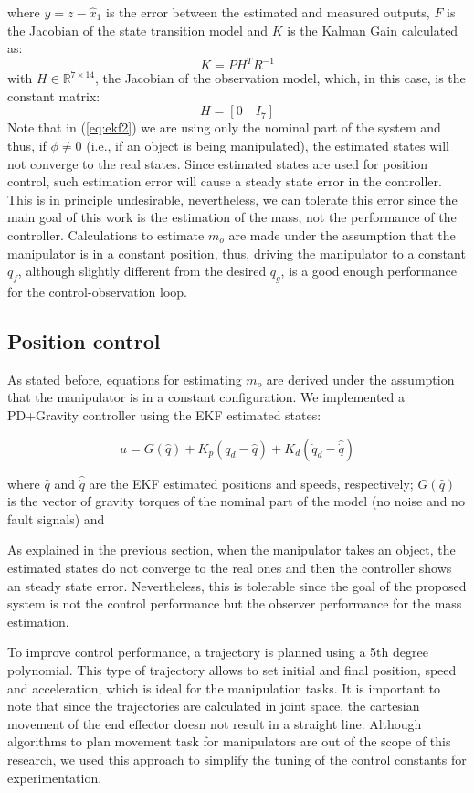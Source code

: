 \documentclass[a4paper, 10pt]{article}
\begin{document}
where $y=z - \hat{x}_1$ is the error between the estimated and measured outputs, $F$ is the Jacobian of the state transition model and $K$ is the Kalman Gain calculated as:
\[
K = PH^TR^{-1}
\]
with $H\in\mathbb{R}^{7\times 14}$, the Jacobian of the observation model, which, in this case, is the constant matrix:
\[
H = \left[0\quad I_7\right]
\]
Note that in (\ref{eq:ekf2}) we are using only the nominal part of the system and thus, if $\phi\neq 0$ (i.e., if an object is being manipulated), the estimated states will not converge to the real states. Since estimated states are used for position control, such estimation error will cause a steady state error in the controller. This is in principle undesirable, nevertheless, we can tolerate this error since the main goal of this work is the estimation of the mass, not the performance of the controller. Calculations to estimate $m_o$ are made under the assumption that the manipulator is in a constant position, thus, driving the manipulator to a constant $q_f$, although slightly different from the desired $q_g$, is a good enough performance for the control-observation loop.

\subsection{Position control}
As stated before, equations for estimating $m_o$ are derived under the assumption that the manipulator is in a constant configuration. We implemented a PD+Gravity controller using the EKF estimated states:

\begin{equation}
  u = G(\hat{q}) + K_p(q_d - \hat{q}) + K_d(\dot{q}_d - \hat{\dot{q}})
\end{equation}

where $\hat{q}$ and $\hat{\dot{q}}$ are the EKF estimated positions and speeds, respectively; $G(\hat{q})$ is the vector of gravity torques of the nominal part of the model (no noise and no fault signals) and 

As explained in the previous section, when the manipulator takes an object, the estimated states do not converge to the real ones and then the controller shows an steady state error. Nevertheless, this is tolerable since the goal of the proposed system is not the control performance but the observer performance for the mass estimation.

To improve control performance, a trajectory is planned using a 5th degree polynomial. This type of trajectory allows to set initial and final position, speed and acceleration, which is ideal for the manipulation tasks. It is important to note that since the trajectories are calculated in joint space, the cartesian movement of the end effector doesn not result in a straight line. Although algorithms to plan movement task for manipulators are out of the scope of this research, we used this approach to simplify the tuning of the control constants for experimentation.
\end{document}
